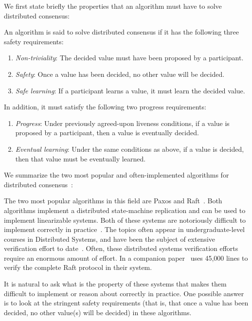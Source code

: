 We first state briefly the properties that an algorithm must have to solve
distributed consensus:
\begin{definition}
  \label{def:consensus}
  An algorithm is said to solve distributed consensus if it has the following
  three safety requirements:
  \begin{enumerate}
    \item \emph{Non-triviality}: The decided value must have been proposed by a
      participant.
    \item \emph{Safety}: Once a value has been decided, no other value will be
      decided.
    \item \emph{Safe learning}: If a participant learns a value, it must learn
      the decided value.
  \end{enumerate}
  In addition, it must satisfy the following two progress requirements:
  \begin{enumerate}
    \item \emph{Progress}: Under previously agreed-upon liveness conditions, if
      a value is proposed by a participant, then a value is eventually decided.
    \item \emph{Eventual learning}: Under the same conditions as above, if a
      value is decided, then that value must be eventually learned.
  \end{enumerate}
\end{definition}

We summarize the two most popular and often-implemented algorithms for
distributed consensus~\citep{howard20}:

The two most popular algorithms in this field are Paxos and
Raft~\citep{howard20,lamport98,ongaro14}. Both algorithms implement a
distributed state-machine replication and can be used to implement linearizable
systems. Both of these systems are notoriously difficult to implement correctly
in practice~\citep{howard20}. The topics often appear in undergraduate-level
courses in Distributed Systems, and have been the subject of extensive
verification effort to date~\citep{wilcox15}. Often, these distributed systems
verification efforts require an enormous amount of effort.  In a companion
paper~\citet{woos16} uses 45,000 lines to verify the complete Raft protocol in
their system.

It is natural to ask what is the property of these systems that makes them
difficult to implement or reason about correctly in practice. One possible
answer is to look at the stringent safety requirements (that is, that once a
value has been decided, no other value(s) will be decided) in these algorithms.

